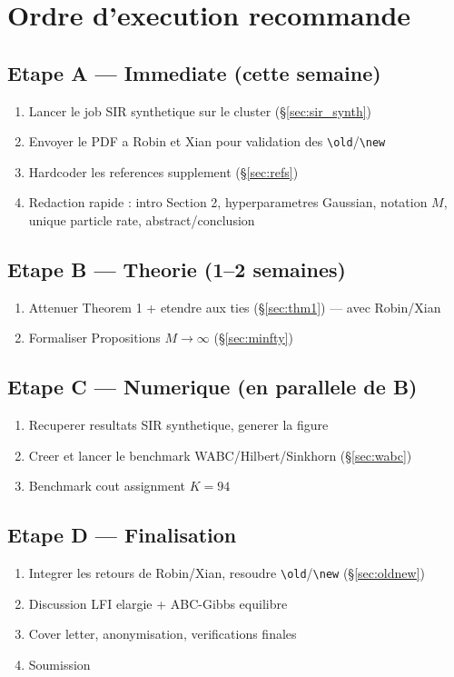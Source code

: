 \documentclass[11pt]{article}
\begin{document}
\section{Ordre d'execution recommande}

\subsection*{Etape A --- Immediate (cette semaine)}
\begin{enumerate}[nosep]
    \item Lancer le job SIR synthetique sur le cluster (\S\ref{sec:sir_synth})
    \item Envoyer le PDF a Robin et Xian pour validation des \verb|\old|/\verb|\new|
    \item Hardcoder les references supplement (\S\ref{sec:refs})
    \item Redaction rapide : intro Section 2, hyperparametres Gaussian, notation $M$, unique particle rate, abstract/conclusion
\end{enumerate}

\subsection*{Etape B --- Theorie (1--2 semaines)}
\begin{enumerate}[nosep]
    \item Attenuer Theorem 1 + etendre aux ties (\S\ref{sec:thm1}) --- avec Robin/Xian
    \item Formaliser Propositions $M\to\infty$ (\S\ref{sec:minfty})
\end{enumerate}

\subsection*{Etape C --- Numerique (en parallele de B)}
\begin{enumerate}[nosep]
    \item Recuperer resultats SIR synthetique, generer la figure
    \item Creer et lancer le benchmark WABC/Hilbert/Sinkhorn (\S\ref{sec:wabc})
    \item Benchmark cout assignment $K=94$
\end{enumerate}

\subsection*{Etape D --- Finalisation}
\begin{enumerate}[nosep]
    \item Integrer les retours de Robin/Xian, resoudre \verb|\old|/\verb|\new| (\S\ref{sec:oldnew})
    \item Discussion LFI elargie + ABC-Gibbs equilibre
    \item Cover letter, anonymisation, verifications finales
    \item Soumission
\end{enumerate}
\end{document}
